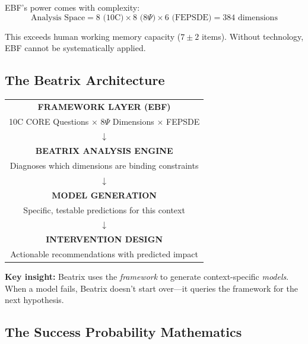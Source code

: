 EBF's power comes with complexity:
\begin{equation}
\text{Analysis Space} = 8 \text{ (10C)} \times 8 \text{ (8$\Psi$)} \times 6 \text{ (FEPSDE)} = 384 \text{ dimensions}
\end{equation}

This exceeds human working memory capacity ($7 \pm 2$ items). Without technology,
EBF cannot be systematically applied.

\subsection{The Beatrix Architecture}

\begin{tcolorbox}[colback=purple!5!white, colframe=purple!75!black,
    title=\textbf{Beatrix: Framework-to-Model Generator}]

\begin{center}
\begin{tabular}{@{}c@{}}
\textbf{FRAMEWORK LAYER (EBF)} \\
10C CORE Questions $\times$ 8$\Psi$ Dimensions $\times$ FEPSDE \\
$\downarrow$ \\
\textbf{BEATRIX ANALYSIS ENGINE} \\
Diagnoses which dimensions are binding constraints \\
$\downarrow$ \\
\textbf{MODEL GENERATION} \\
Specific, testable predictions for this context \\
$\downarrow$ \\
\textbf{INTERVENTION DESIGN} \\
Actionable recommendations with predicted impact \\
\end{tabular}
\end{center}

\textbf{Key insight:} Beatrix uses the \textit{framework} to generate context-specific \textit{models}.
When a model fails, Beatrix doesn't start over---it queries the framework for the next hypothesis.

\end{tcolorbox}

\subsection{The Success Probability Mathematics}

